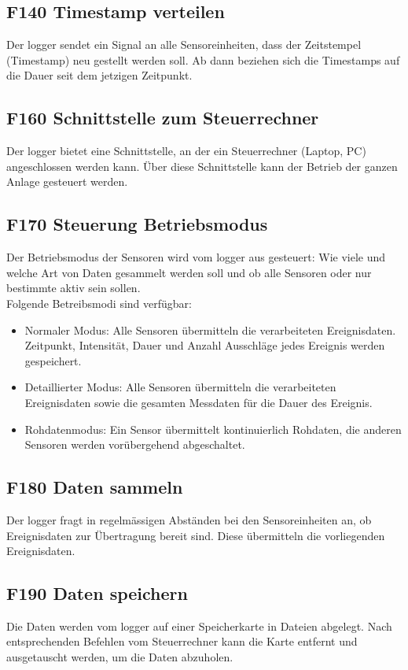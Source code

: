 \subsection{F140 Timestamp verteilen}
Der \gls{logger} sendet ein Signal an alle Sensoreinheiten, dass der Zeitstempel (Timestamp) neu gestellt werden soll. Ab dann beziehen sich die Timestamps auf die Dauer seit dem jetzigen Zeitpunkt.


\subsection{F160 Schnittstelle zum Steuerrechner}
Der \gls{logger} bietet eine Schnittstelle, an der ein Steuerrechner (Laptop, PC) angeschlossen werden kann. Über diese Schnittstelle kann der Betrieb der ganzen Anlage gesteuert werden.


\subsection{F170 Steuerung Betriebsmodus}
Der Betriebsmodus der Sensoren wird vom \gls{logger} aus gesteuert: Wie viele und welche Art von Daten gesammelt werden soll und ob alle Sensoren oder nur bestimmte aktiv sein sollen. \\
Folgende Betreibsmodi sind verfügbar:
\begin{itemize}
\item Normaler Modus: Alle Sensoren übermitteln die verarbeiteten Ereignisdaten. Zeitpunkt, Intensität, Dauer und Anzahl Ausschläge jedes Ereignis werden gespeichert.
\item Detaillierter Modus: Alle Sensoren übermitteln die verarbeiteten Ereignisdaten sowie die gesamten Messdaten für die Dauer des Ereignis.
\item Rohdatenmodus: Ein Sensor übermittelt kontinuierlich Rohdaten, die anderen Sensoren werden vorübergehend abgeschaltet.
\end{itemize}


\subsection{F180 Daten sammeln}
Der \gls{logger} fragt in regelmässigen Abständen bei den Sensoreinheiten an, ob Ereignisdaten zur Übertragung bereit sind. Diese übermitteln die vorliegenden Ereignisdaten.


\subsection{F190 Daten speichern}
Die Daten werden vom \gls{logger} auf einer Speicherkarte in Dateien abgelegt. Nach entsprechenden Befehlen vom Steuerrechner kann die Karte entfernt und ausgetauscht werden, um die Daten abzuholen.


